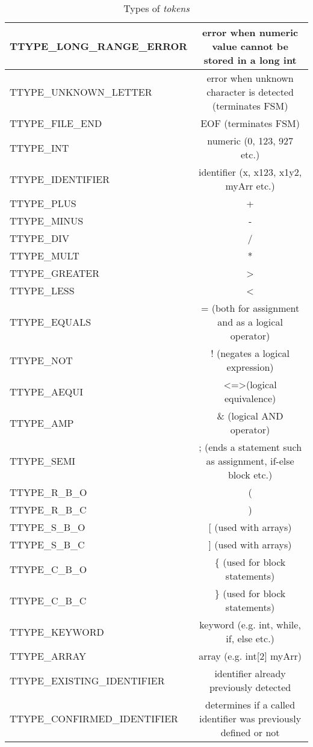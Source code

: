    \begin{table}
	  	\begin{tabular}{|l|c|}
	  	\hline 
	  	TTYPE\_LONG\_RANGE\_ERROR & error when numeric value cannot be stored in a long int \\ 
	  	\hline 
	  	TTYPE\_UNKNOWN\_LETTER & error when unknown character is detected (terminates FSM) \\ 
	  	\hline 
	  	TTYPE\_FILE\_END & EOF (terminates FSM) \\ 
	  	\hline 
	  	TTYPE\_INT & numeric (0, 123, 927 etc.) \\ 
	  	\hline 
	  	TTYPE\_IDENTIFIER & identifier (x, x123, x1y2, myArr etc.) \\ 
	  	\hline 
	  	TTYPE\_PLUS & + \\ 
	  	\hline 
	  	TTYPE\_MINUS & - \\ 
	  	\hline 
	  	TTYPE\_DIV & / \\ 
	  	\hline 
	  	TTYPE\_MULT & * \\ 
	  	\hline 
	  	TTYPE\_GREATER & \textgreater \\ 
	  	\hline 
	  	TTYPE\_LESS & \textless \\ 
	  	\hline 
	  	TTYPE\_EQUALS & = (both for assignment and as a logical operator) \\ 
	  	\hline 
	  	TTYPE\_NOT & ! (negates a logical expression) \\ 
	  	\hline 
	  	TTYPE\_AEQUI &  \textless=\textgreater (logical equivalence) \\ 
	  	\hline 
	  	TTYPE\_AMP & \& (logical AND operator) \\ 
	  	\hline 
	  	TTYPE\_SEMI & ; (ends a statement such as assignment, if-else block etc.) \\ 
	  	\hline 
	  	TTYPE\_R\_B\_O & ( \\ 
	  	\hline 
	  	TTYPE\_R\_B\_C & ) \\ 
	  	\hline 
	  	TTYPE\_S\_B\_O & [ (used with arrays) \\ 
	  	\hline 
	  	TTYPE\_S\_B\_C & ] (used with arrays) \\ 
	  	\hline 
	  	TTYPE\_C\_B\_O & \{ (used for block statements) \\ 
	  	\hline 
	  	TTYPE\_C\_B\_C & \} (used for block statements) \\ 
	  	\hline 
	  	TTYPE\_KEYWORD & keyword (e.g. int, while, if, else etc.) \\ 
	  	\hline 
	  	TTYPE\_ARRAY & array (e.g. int[2] myArr) \\ 
	  	\hline 
	  	TTYPE\_EXISTING\_IDENTIFIER & identifier already previously detected \\ 
	  	\hline 
	  	TTYPE\_CONFIRMED\_IDENTIFIER & determines if a called identifier was previously defined or not \\ 
	  	\hline
	  	\end{tabular}
	  	\label{tab:tokens}
	  	\caption{Types of \textit{tokens}}
	\end{table}
  	
